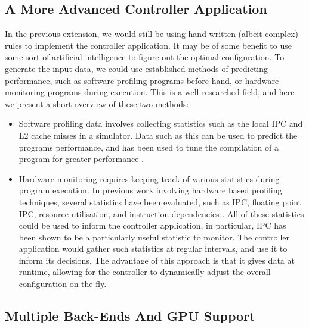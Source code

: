 \subsection{A More Advanced Controller Application}
\label{section:conclusion_and_future_work:a_more_advanced_controller_application}

In the previous extension, we would still be using hand written (albeit complex) rules to implement the controller application. It may be of some benefit to use some sort of artificial intelligence to figure out the optimal configuration. To generate the input data, we could use established methods of predicting performance, such as software profiling programs before hand, or hardware monitoring programs during execution. This is a well researched field, and here we present a short overview of these two methods:

\begin{itemize}
    \item Software profiling data involves collecting statistics such as the local IPC and L2 cache misses in a simulator. Data such as this can be used to predict the programs performance, and has been used to tune the compilation of a program for greater performance \cite{duesterwald_bala_2000}.
    
    \item Hardware monitoring requires keeping track of various statistics during program execution. In previous work involving hardware based profiling techniques, several statistics have been evaluated, such as IPC, floating point IPC, resource utilisation, and instruction dependencies \cite{bahar_manne_2001, buyuktosunoglu_schuster_brooks_bose_cook_albonesi_2001, folegnani_gonzalez, maro_bai_bahar_2001, ponomarev_kucuk_ghose, sasanka_hughes_adve_2002, seng_tune_tullsen}. All of these statistics could be used to inform the controller application, in particular, IPC has been shown to be a particularly useful statistic to monitor. The controller application would gather such statistics at regular intervals, and use it to inform its decisions. The advantage of this approach is that it gives data at runtime, allowing for the controller to dynamically adjust the overall configuration on the fly.
\end{itemize}



\subsection{Multiple Back-Ends And GPU Support}
\label{section:conclusion_and_future_work:multiple_backends_and_gpu_support}

